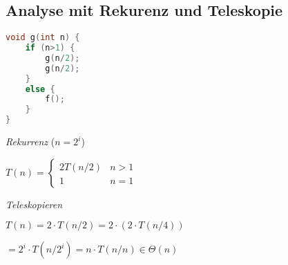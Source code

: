 \begin{sectionbox}
\subsection{Analyse mit Rekurenz und Teleskopie}\par\smallskip
\begin{lstlisting}[language=c++]
void g(int n) {
    if (n>1) {
        g(n/2);
        g(n/2);
    }
    else {
        f();
    }
}
\end{lstlisting}\vspace{-4px}
\textit{Rekurrenz} ($n=2^{i}$)\par
$T(n)=\left\{\begin{array}{ll}2 T(n / 2) & n>1 \\ 1 & n=1\end{array}\right.$\par\smallskip
\textit{Teleskopieren}\par
$T(n)=2 \cdot T(n / 2) = 2 \cdot (2 \cdot T(n / 4)) $ \par
$= 2^{i} \cdot T(n/2^{i}) = n \cdot T(n/n) \in \Theta(n)$\par\smallskip

\end{sectionbox}